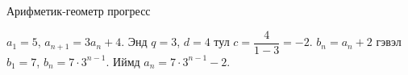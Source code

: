 \begin{frame}[allowframebreaks]{Арифметик-геометр прогресс}
\begin{example}
$a_1=5$, $a_{n+1}=3a_n+4$. Энд $q=3$, $d=4$ тул $c=\dfrac{4}{1-3}=-2$.
$b_n=a_n+2$ гэвэл $b_1=7$, $b_n=7\cdot3^{n-1}$. Иймд $\boxed{a_n=7\cdot3^{n-1}-2.}$
\end{example}
\end{frame}


